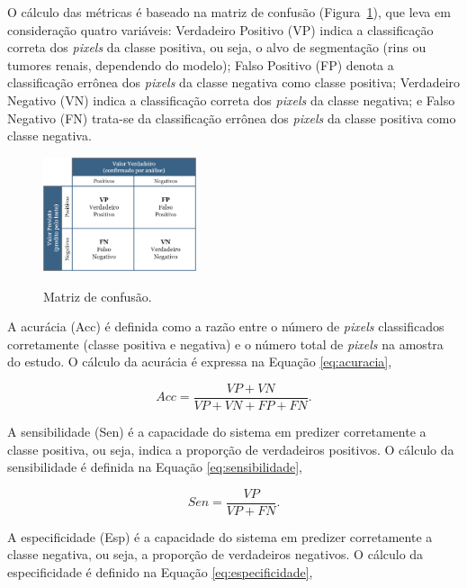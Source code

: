 O cálculo das métricas é baseado na matriz de confusão (Figura~\ref{fig:matriz_confusao}), que leva em consideração quatro variáveis: Verdadeiro Positivo (VP) indica a classificação correta dos \textit{pixels} da classe positiva, ou seja, o alvo de segmentação (rins ou tumores renais, dependendo do modelo); Falso Positivo (FP) denota a classificação errônea dos \textit{pixels} da classe negativa como classe positiva; Verdadeiro Negativo (VN) indica a classificação correta dos \textit{pixels} da classe negativa; e Falso Negativo (FN) trata-se da classificação errônea dos \textit{pixels} da classe positiva como classe negativa.

\begin{figure}[!ht]
    \centering
    \caption{Matriz de confusão.}
    \includegraphics[width=0.4\textwidth]{figuras/matriz_confusao2.png}
    \label{fig:matriz_confusao}
\end{figure}

A acurácia (Acc) é definida como a razão entre o número de \textit{pixels} classificados corretamente (classe positiva e negativa) e o número total de \textit{pixels} na amostra do estudo. O cálculo da acurácia é expressa na Equação \ref{eq:acuracia},

\begin{equation}
\label{eq:acuracia}
Acc = \frac{VP + VN}{VP + VN + FP + FN}.
\end{equation}

A sensibilidade (Sen) é a capacidade do sistema em predizer corretamente a classe positiva, ou seja, indica a proporção de verdadeiros positivos. O cálculo da sensibilidade é definida na Equação \ref{eq:sensibilidade},

\begin{equation}
\label{eq:sensibilidade}
Sen = \frac{VP}{VP + FN}.
\end{equation}

A especificidade (Esp) é a capacidade do sistema em predizer corretamente a classe negativa, ou seja, a proporção de verdadeiros negativos. O cálculo da especificidade é definido na Equação \ref{eq:especificidade},

